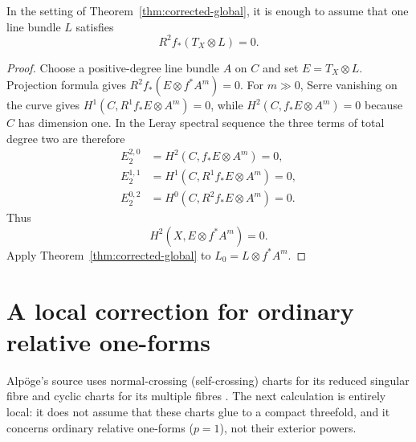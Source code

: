\begin{corollary}
\label{cor:relative}
In the setting of Theorem~\ref{thm:corrected-global}, it is enough to assume
that one line bundle $L$ satisfies
\[
 R^2f_*(T_X\otimes L)=0.
 \tag{5.8}
\]
\end{corollary}

\begin{proof}
Choose a positive-degree line bundle $A$ on $C$ and set
$E=T_X\otimes L$.  Projection formula gives
\(R^2f_*(E\otimes f^*A^m)=0\).  For $m\gg0$, Serre vanishing on the curve
gives
\(H^1(C,R^1f_*E\otimes A^m)=0\), while
\(H^2(C,f_*E\otimes A^m)=0\) because $C$ has dimension one.  In the Leray
spectral sequence the three terms of total degree two are therefore
\[
\begin{aligned}
 E_2^{2,0}&=H^2(C,f_*E\otimes A^m)=0,\\
 E_2^{1,1}&=H^1(C,R^1f_*E\otimes A^m)=0,\\
 E_2^{0,2}&=H^0(C,R^2f_*E\otimes A^m)=0.
\end{aligned}
\]
Thus
\[
 H^2(X,E\otimes f^*A^m)=0.
\]
Apply Theorem~\ref{thm:corrected-global} to
$L_0=L\otimes f^*A^m$.
\end{proof}

\section{A local correction for ordinary relative one-forms}
\label{sec:relative-one-forms}

Alp{\"o}ge's source uses normal-crossing (self-crossing) charts for its reduced
singular fibre and cyclic charts for its multiple fibres
\cite[Sec.~10.2, source PDF pp.~87--88]{S6Source}.  The next
calculation is entirely local: it does not assume that these charts glue to a
compact threefold, and it concerns ordinary relative one-forms ($p=1$), not
their exterior powers.

